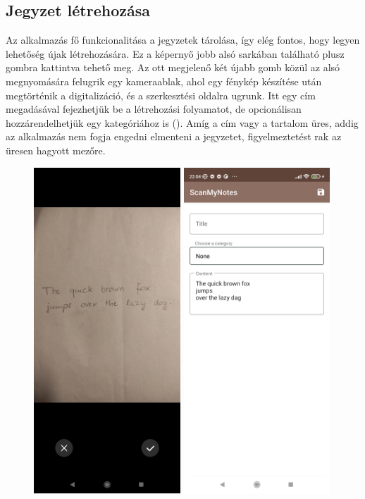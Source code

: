 \subsection{Jegyzet létrehozása}
Az alkalmazás fő funkcionalitása a jegyzetek tárolása, így elég fontos, hogy legyen lehetőség újak létrehozására. Ez a képernyő jobb alsó sarkában található plusz gombra kattintva tehető meg. Az ott megjelenő két újabb gomb közül az alsó megnyomására felugrik egy kameraablak, ahol egy fénykép készítése után megtörténik a digitalizáció, és a szerkesztési oldalra ugrunk. Itt egy cím megadásával fejezhetjük be a létrehozási folyamatot, de opcionálisan hozzárendelhetjük egy kategóriához is (). Amíg a cím vagy a tartalom üres, addig az alkalmazás nem fogja engedni elmenteni a jegyzetet, figyelmeztetést rak az üresen hagyott mezőre.
\begin{figure}[!ht]
	\centering
	\includegraphics[width=55mm, keepaspectratio]{figures/newnote_photo.jpg}
	\includegraphics[width=55mm, keepaspectratio]{figures/newnote_create.jpg}

\end{figure}
